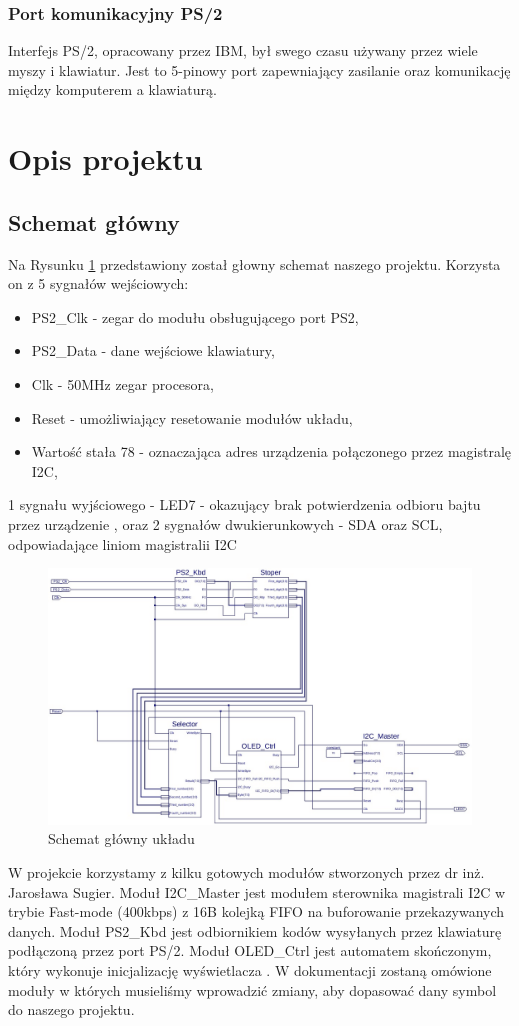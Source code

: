 \documentclass[]{article}
\begin{document}
	\subsubsection{Port komunikacyjny PS/2}
	Interfejs PS/2, opracowany przez IBM, był swego czasu używany przez wiele myszy i klawiatur. Jest to 5-pinowy port zapewniający zasilanie oraz komunikację między komputerem a klawiaturą. \cite{ps/2}


	\section{Opis projektu}
	\subsection{Schemat główny}
	Na Rysunku \ref{fig:top} przedstawiony został głowny schemat naszego projektu. Korzysta on z 5 sygnałów wejściowych:
	\begin{itemize}
		\item PS2\_Clk - zegar do modułu obsługującego port PS2,
		\item PS2\_Data - dane wejściowe klawiatury,
		\item Clk - 50MHz zegar procesora,
		\item Reset - umożliwiający resetowanie modułów układu,
		\item Wartość stała 78 - oznaczająca adres urządzenia połączonego przez magistralę I2C,
	\end{itemize}
	1 sygnału wyjściowego - LED7 - okazujący brak potwierdzenia odbioru bajtu przez urządzenie , oraz 2 sygnałów dwukierunkowych - SDA oraz SCL, odpowiadające liniom magistralii I2C
	\begin{figure}[H]
		\includegraphics[width=\linewidth]{img/top.jpg}
		\caption{Schemat główny układu}
		\label{fig:top}
	\end{figure}
	W projekcie korzystamy z kilku gotowych modułów stworzonych przez dr inż. Jarosława Sugier. Moduł I2C\_Master jest modułem sterownika magistrali I2C w trybie Fast-mode (400kbps) z 16B kolejką FIFO na buforowanie przekazywanych danych. Moduł PS2\_Kbd jest odbiornikiem kodów wysyłanych przez klawiaturę podłączoną przez port PS/2. Moduł OLED\_Ctrl jest automatem skończonym, który wykonuje inicjalizację wyświetlacza \cite{fpga}. W dokumentacji zostaną omówione moduły w których musieliśmy wprowadzić zmiany, aby dopasować dany symbol do naszego projektu. 
	
\end{document}
